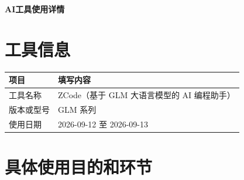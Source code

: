 \documentclass[zihao=-4,a4paper,UTF8,fontset=fandol]{ctexart}
\begin{document}
\thispagestyle{plain}
\begin{center}
  {\heiti{}\bfseries AI工具使用详情}
\end{center}

\section{工具信息}
\noindent
\begin{tabularx}{\textwidth}{@{}p{}Y@{}}
  \toprule
  项目 & 填写内容 \\
  \midrule
  工具名称 & ZCode（基于 GLM 大语言模型的 AI 编程助手） \\
  版本或型号 & GLM 系列 \\
  使用日期 & 2026-09-12 至 2026-09-13 \\
  \bottomrule
\end{tabularx}

\section{具体使用目的和环节}
\end{document}
